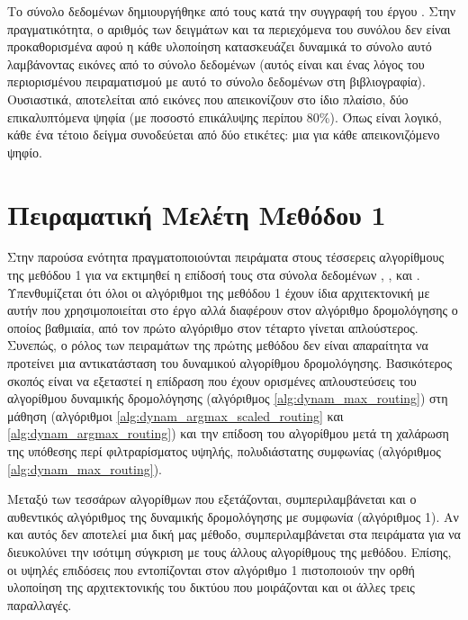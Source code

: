     Το σύνολο δεδομένων  δημιουργήθηκε από τους  κατά την συγγραφή του έργου \cite{sabour2017dynamic}. Στην πραγματικότητα, ο αριθμός των δειγμάτων και τα περιεχόμενα του συνόλου δεν είναι προκαθορισμένα αφού η κάθε υλοποίηση κατασκευάζει δυναμικά το σύνολο αυτό λαμβάνοντας εικόνες από το σύνολο δεδομένων  (αυτός είναι και ένας λόγος του περιορισμένου πειραματισμού με αυτό το σύνολο δεδομένων στη βιβλιογραφία). Ουσιαστικά, αποτελείται από εικόνες που απεικονίζουν στο ίδιο πλαίσιο, δύο επικαλυπτόμενα ψηφία (με ποσοστό επικάλυψης περίπου 80\%). Όπως είναι λογικό, κάθε ένα τέτοιο δείγμα συνοδεύεται από δύο ετικέτες: μια για κάθε απεικονιζόμενο ψηφίο.
    

\section{Πειραματική Μελέτη Μεθόδου 1}

Στην παρούσα ενότητα πραγματοποιούνται πειράματα στους τέσσερεις αλγορίθμους της μεθόδου 1 για να εκτιμηθεί η επίδοσή τους στα σύνολα δεδομένων \cite{deng2012mnist}, \cite{Xiao2017FashionMNISTAN}, \cite{CIFAR10} και \cite{lecun2004learning}. Υπενθυμίζεται ότι όλοι οι αλγόριθμοι της μεθόδου 1 έχουν ίδια αρχιτεκτονική με αυτήν που χρησιμοποιείται στο έργο \cite{sabour2017dynamic} αλλά διαφέρουν στον αλγόριθμο δρομολόγησης ο οποίος βαθμιαία, από τον πρώτο αλγόριθμο στον τέταρτο γίνεται απλούστερος. Συνεπώς, ο ρόλος των πειραμάτων της πρώτης μεθόδου δεν είναι απαραίτητα να προτείνει μια αντικατάσταση του δυναμικού αλγορίθμου δρομολόγησης. Βασικότερος σκοπός είναι να εξεταστεί η επίδραση που έχουν ορισμένες απλουστεύσεις του αλγορίθμου δυναμικής δρομολόγησης (αλγόριθμος \ref{alg:dynam_max_routing}) στη μάθηση (αλγόριθμοι \ref{alg:dynam_argmax_scaled_routing} και \ref{alg:dynam_argmax_routing}) και την επίδοση του αλγορίθμου μετά τη χαλάρωση της υπόθεσης περί φιλτραρίσματος υψηλής, πολυδιάστατης συμφωνίας (αλγόριθμος \ref{alg:dynam_max_routing}).\par

Μεταξύ των τεσσάρων αλγορίθμων που εξετάζονται, συμπεριλαμβάνεται και ο αυθεντικός αλγόριθμος της δυναμικής δρομολόγησης με συμφωνία (αλγόριθμος 1). Αν και αυτός δεν αποτελεί μια δική μας μέθοδο, συμπεριλαμβάνεται στα πειράματα για να διευκολύνει την ισότιμη σύγκριση με τους άλλους αλγορίθμους της μεθόδου. Επίσης, οι υψηλές επιδόσεις που εντοπίζονται στον αλγόριθμο 1 πιστοποιούν την ορθή υλοποίηση της αρχιτεκτονικής του δικτύου που μοιράζονται και οι άλλες τρεις παραλλαγές.\par


